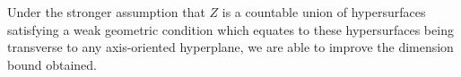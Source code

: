 \documentclass[dvipsnames,letterpaper,12pt]{article}
\numberwithin{equation}{section}
\DeclareMathOperator{\fordim}{\dim_{\mathbf{F}}}
\DeclareMathOperator{\RR}{\mathbf{R}}
\DeclareMathOperator{\ZZ}{\mathbf{Z}}
\numberwithin{theorem}{section}
\begin{document}
\begin{comment}
A well-known result in this pattern avoidance setting is that sets with large Fourier dimension satisfy many algebraic relations. More precisely, if integer coefficients $m_1, \dots, m_n \in \ZZ$ are fixed, and we consider a compact set $X \subset \RR$ with $\fordim(X) > 2/n$, then the sum set $m_1 X + \dots + m_n X$ contains an open interval. It follows by a slight modification of these coefficients that if $X \subset \RR$ and $\fordim(X) > 2/n$, then there exists $m_1, \dots, m_n \in \ZZ$, distinct points $x_1, \dots, x_n \in X$, and an additional integer $a \in \ZZ$, such that
%
\begin{equation} \label{intequation}
    m_1 x_1 + \dots + m_n x_n = a.
\end{equation}
%
It is an interesting to determine how tight this result is. In \cite{Korner2}, T.W. K\"{o}rner constructs a Salem set $X$ with Fourier dimension $1/(n-1)$ such that for non-zero $m \in \ZZ^n$, and $a \in \ZZ$, $X$ does not contain distinct points $x_1, \dots, x_n$ solving \eqref{intequation}. If, for each nonzero $m \in \ZZ^n$ and $a \in \ZZ$, we consider the set
%
\[ Z_{m,a} = \left\{ (x_1, \dots, x_n) \in [0,1]^n : m_1x_1 + \dots + m_n x_n = a \right\}, \]
%
then $Z_{m,a}$ is a subset of an $n-1$ dimensional hyperplane, and thus can be easily seen to have Minkowski dimension $n-1$. It follows that we can apply Theorem \ref{maintheorem} to $Z = \bigcup \{ Z_{m,a} : m \neq 0, a \in \ZZ \}$ to obtain a Salem set $X \subset [0,1]$ with dimension
%
\[ \frac{n - (n-1)}{n - 1} = \frac{1}{n-1}, \]
%
such that $(x_1, \dots, x_n) \not \in Z$ for each distinct $x_1, \dots, x_n \in X$. This means precisely that $X$ avoids solutions to $\eqref{intequation}$ for all nonzero $m \in \ZZ^n$ and $a \in \ZZ$. Thus we see Theorem \ref{maintheorem} generalizes K\"{o}rner's result, and thus shows the result depends little on the arithmetic properties of the pattern K\"{o}rner avoids, but rather, depends only on the `thickness' of the family of tuples $(x_1, \dots, x_n)$ satisfying the pattern. Since we expect Theorem \ref{maintheorem} to be tight for general sets, an improvement to K\"{o}rner's construction must rely more heavily on the algebraic properties of the pattern involved.
\end{comment}

Under the stronger assumption that $Z$ is a countable union of hypersurfaces satisfying a weak geometric condition which equates to these hypersurfaces being transverse to any axis-oriented hyperplane, we are able to improve the dimension bound obtained.
\end{document}
